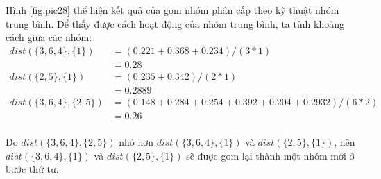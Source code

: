 Hình \ref{fig:pic28} thể hiện kết quả của gom nhóm phân cấp theo kỹ thuật nhóm trung bình.
Để thấy được cách hoạt động của nhóm trung bình, ta tính khoảng cách giữa các nhóm:
\begin{equation}
\begin{aligned}
dist(\{3, 6, 4\}, \{1\})
&= (0.221 + 0.368 + 0.234) / (3 * 1)	\\ 
&= 0.28									\\
dist(\{2, 5\}, \{1\})
&= (0.235 + 0.342) / (2 * 1)			\\
&= 0.2889								\\
dist(\{3, 6, 4\}, \{2, 5\})				
&= (0.148 + 0.284 + 0.254 + 0.392 + 0.204 + 0.2932) /  (6 * 2)	\\
&= 0.26									\\
\end{aligned}
\end{equation}

Do $dist(\{3, 6, 4\}, \{2, 5\})$ nhỏ hơn $dist(\{3, 6, 4\}, \{1\})$ và $dist(\{2, 5\}, \{1\})$, nên $dist(\{3, 6, 4\}, \{1\})$ và $dist(\{2, 5\}, \{1\})$ sẽ được gom lại thành một nhóm mới ở bước thứ tư.

